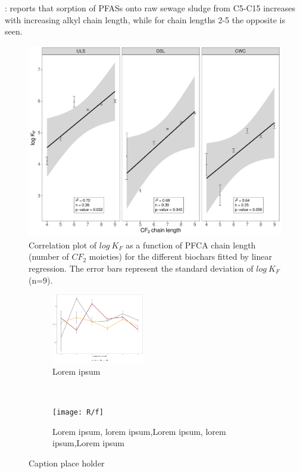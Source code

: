 \citep{zhang2013sorption}: reports that sorption of PFASs onto raw sewage sludge from C5-C15 increases with increasing alkyl chain length, while for chain lengths 2-5 the opposite is seen. 

\begin{figure}
    \centering
    \includegraphics[width=\textwidth]{R/figs/chainlength_KF.pdf}
    \caption{Correlation plot of $log~K_F$ as a function of PFCA chain length (number of $CF_2$ moieties) for the different biochars fitted by linear regression. The error bars represent the standard deviation of $log~ K_F$ (n=9).}
    \label{fig:chainlength}
\end{figure}

\begin{figure}[t!]
    \centering
    \begin{subfigure}[t]{0.5\textwidth}
        \centering
        \includegraphics[height=1.2in]{R/figs/n_KF.pdf}
        \caption{Lorem ipsum}
    \end{subfigure}%
    ~ 
    \begin{subfigure}[t]{0.5\textwidth}
        \centering
        \texttt{[image: R/f]}
        \caption{Lorem ipsum, lorem ipsum,Lorem ipsum, lorem ipsum,Lorem ipsum}
    \end{subfigure}
    \caption{Caption place holder}
\end{figure}

